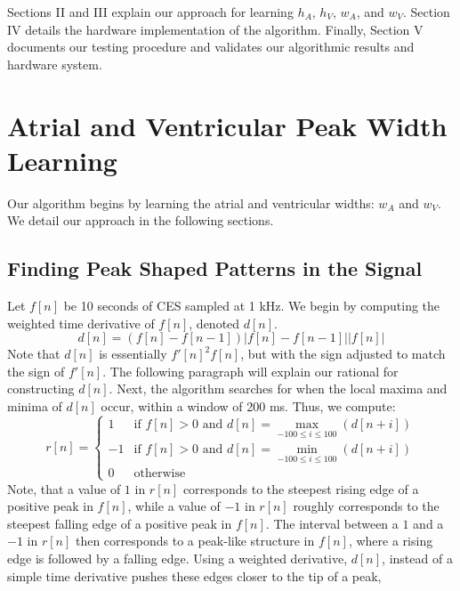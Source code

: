 \documentclass[conference]{IEEEtran}
\newcommand{\APW}{\ensuremath{w_A}}
\newcommand{\VPW}{\ensuremath{w_V}}
\newcommand{\APH}{\ensuremath{h_A}}
\newcommand{\VPH}{\ensuremath{h_V}}
\begin{document}
Sections II and III explain our approach
for learning \APH{}, \VPH{}, \APW{}, and \VPW{}. Section IV
details the hardware implementation of the algorithm.
Finally, Section V documents our testing procedure and
validates our algorithmic results and hardware system.

\section{Atrial and Ventricular Peak Width Learning}
Our algorithm begins by learning the atrial and ventricular widths: \APW{} and \VPW{}. We
detail our approach in the following sections.

\subsection{Finding Peak Shaped Patterns in the Signal}
Let $f[n]$ be 10 seconds of CES sampled at 1 kHz.
We begin by computing the weighted time
derivative of $f[n]$, denoted $d[n]$.
\begin{equation*}
	d[n]=(f[n]-f[n-1])\left|f[n] - f[n-1]\right| \left|f[n]\right|
\end{equation*}
Note that $d[n]$ is essentially $f'[n]^2  f[n]$, but with the sign adjusted to match the sign of $f'[n]$.
The following paragraph will explain our rational for constructing $d[n]$. Next, the algorithm 
searches for when the local
maxima and minima of $d[n]$ occur, within a window of
200 ms. Thus, we compute:
\begin{equation*}
	r[n] = \left \{
		\begin{array}{lc}
			1 & \text{if } f[n]>0 \text{ and } d[n] = \max\limits_{-100 \le i \le 100} (d[n+i]) \\
			-1 & \text{if } f[n]>0 \text{ and }  d[n] = \min\limits_{-100 \le i \le 100} (d[n+i]) \\
			0 & \text{otherwise}
		\end{array}
	\right.
\end{equation*}
Note, that a value of $1$ in $r[n]$ corresponds to the
steepest rising edge of a positive peak in $f[n]$, while a value of $-1$
in $r[n]$ roughly corresponds to the steepest falling edge of a positive peak
in $f[n]$. 
The interval between a $1$ and a $-1$ in $r[n]$ then corresponds to a
peak-like structure in $f[n]$, where a rising edge is followed by a falling edge.
Using a weighted derivative, $d[n]$, instead of a simple time derivative pushes these edges closer to the tip of a peak,
\end{document}
